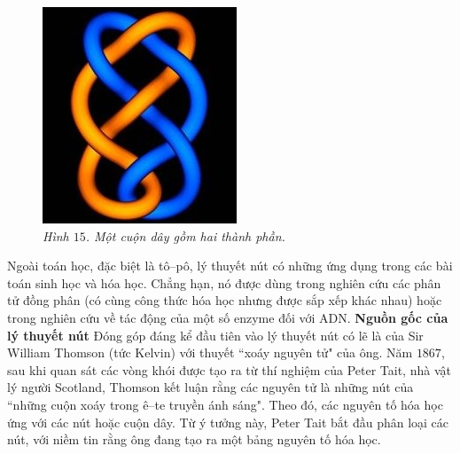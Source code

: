 \begin{multicols}{2}
\begin{figure}[H]
		\vspace*{-10pt}
		\centering
		\captionsetup{labelformat= empty, justification=centering}
		\includegraphics[width= 0.47\linewidth]{fig_15}
		\caption{\small\textit{\color{duongvaotoanhoc}Hình $15$. Một cuộn dây gồm hai thành phần.}}
		\vspace*{-10pt}
	\end{figure}
	Ngoài toán học, đặc biệt là tô--pô, lý thuyết nút có những ứng dụng trong các bài toán sinh học và hóa học. Chẳng hạn, nó được dùng trong nghiên cứu các phân tử đồng phân (có cùng công thức hóa học nhưng được sắp xếp khác nhau) hoặc trong nghiên cứu về tác động của một số enzyme đối với ADN.
	\vskip 0.1cm
	\textbf{\color{duongvaotoanhoc}Nguồn gốc của lý thuyết nút}
	\vskip 0.1cm
	Đóng góp đáng kể đầu tiên vào lý thuyết nút có lẽ là của Sir William Thomson (tức Kelvin) với thuyết ``xoáy nguyên tử" của ông. Năm $1867$, sau khi quan sát các vòng khói được tạo ra từ thí nghiệm của Peter Tait, nhà vật lý người Scotland, Thomson kết luận rằng các nguyên tử là những nút của ``những cuộn xoáy trong ê--te truyền ánh sáng". Theo đó, các nguyên tố hóa học ứng với các nút hoặc cuộn dây. Từ ý tưởng này, Peter Tait bắt đầu phân loại các nút, với niềm tin rằng ông đang tạo ra một bảng nguyên tố hóa học.
	\vskip 0.15cm
\end{multicols}
